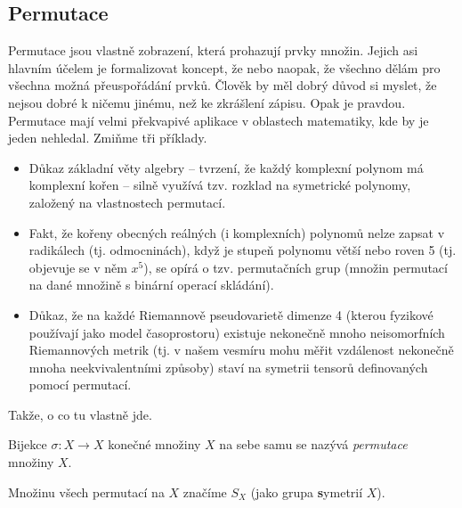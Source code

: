 \subsection{Permutace}
\label{ssec:permutace}

Permutace jsou vlastně zobrazení, která prohazují prvky množin. Jejich asi
hlavním účelem je formalizovat koncept, že  nebo naopak,
že všechno dělám pro všechna možná přeuspořádání prvků. Člověk by měl dobrý
důvod si myslet, že nejsou dobré k ničemu jinému, než ke zkrášlení zápisu. Opak
je pravdou. Permutace mají velmi překvapivé aplikace v oblastech matematiky, kde
by je jeden nehledal. Zmiňme tři příklady.
\begin{itemize}
 \item Důkaz základní věty algebry -- tvrzení, že každý komplexní polynom má
  komplexní kořen -- silně využívá tzv. rozklad na symetrické polynomy, založený
  na vlastnostech permutací.
 \item Fakt, že kořeny obecných reálných (i komplexních) polynomů nelze zapsat v
  radikálech (tj. odmocninách), když je stupeň polynomu větší nebo roven 5 (tj.
  objevuje se v něm $x^{5}$), se opírá o tzv.  permutačních
  grup (množin permutací na dané množině s binární operací skládání).
 \item Důkaz, že na každé Riemannově pseudovarietě dimenze 4 (kterou fyzikové
  používají jako model časoprostoru) existuje nekonečně mno\-ho neisomorfních
  Riemannových metrik (tj. v našem vesmíru mohu měřit vzdálenost nekonečně mnoha
  neekvivalentními způsoby) staví na symetrii tensorů definovaných pomocí
  permutací.
\end{itemize}

Takže, o co tu vlastně jde.
\begin{definition}[Permutace]
 \label{def:permutace}
 Bijekce $\sigma:X \to X$ konečné množiny $X$ na sebe samu se nazývá
 \emph{permutace} množiny $X$.

 Množinu všech permutací na $X$ značíme $S_X$ (jako grupa \textbf{s}ymetrií
 $X$).
\end{definition}
